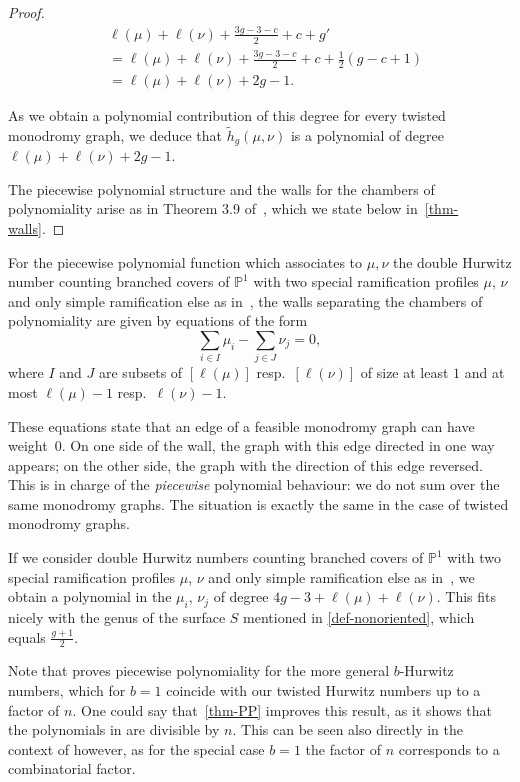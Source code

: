 \begin{proof}
\begin{align*}
&\ell(\mu)+\ell(\nu)+\frac{3g-3-c}{2}+c+g'
\\&= \ell(\mu)+\ell(\nu)+\frac{3g-3-c}{2}+c+\frac{1}{2}(g-c+1)
\\&= \ell(\mu)+\ell(\nu)+2g-1.
\end{align*}

As we obtain a polynomial contribution of this degree for every twisted monodromy graph, we deduce that $\tilde{h}_g(\mu,\nu)$ is a polynomial of degree $\ell(\mu)+\ell(\nu)+2g-1$. 

The piecewise polynomial structure and the walls for the chambers of polynomiality arise as in Theorem 3.9 of~\cite{CJM11}, which we state below in~\cref{thm-walls}.
\end{proof}

\begin{theo}\label{thm-walls}
For the piecewise polynomial function which associates to $\mu,\nu$ the double Hurwitz number counting branched covers of $\mathbb{P}^1$ with two special ramification profiles $\mu$, $\nu$ and only simple ramification else as in~\cite{GJV05, CJM11}, the walls separating the chambers  of polynomiality are given by equations of the form $$\sum_{i\in I} \mu_i - \sum_{j\in J} \nu_j=0,$$ where $I$ and $J$ are subsets of $[\ell(\mu)]$ resp.\ $[\ell(\nu)]$ of size at least $1$ and at most $\ell(\mu)-1$ resp.\ $\ell(\nu)-1$.
\end{theo}
These equations state that an edge of a feasible monodromy graph can have weight~$0$. On one side of the wall, the graph with this edge directed in one way appears; on the other side, the graph with the direction of this edge reversed. This is in charge of the \emph{piecewise} polynomial behaviour: we do not sum over the same monodromy graphs. The situation is exactly the same in the case of twisted monodromy graphs.

\begin{rema}
If we consider double Hurwitz numbers counting branched covers of $\mathbb{P}^1$ with two special ramification profiles $\mu$, $\nu$ and only simple ramification else as in~\cite{GJV05, CJM11}, we obtain a polynomial in the $\mu_i$, $\nu_j$ of degree $4g-3+\ell(\mu)+\ell(\nu)$.
This fits nicely with the genus of the surface $S$ mentioned in \cref{def-nonoriented}, which equals $\frac{g+1}{2}$.
\end{rema}

\begin{rema}
    Note that \cite[Theorem 6.6]{chapuy2020non} proves piecewise polynomiality for the more general $b$-Hurwitz numbers, which for $b=1$ coincide with our twisted Hurwitz numbers up to a factor of $n$. 
    One could say that~\cref{thm-PP} improves this result, as it shows that the polynomials in \cite[Theorem 6.6]{chapuy2020non} are divisible by $n$. This can be seen also directly in the context of \cite[Theorem 6.6]{chapuy2020non} however, as for the special case $b=1$ the factor of $n$ corresponds to a combinatorial factor.
\end{rema}


